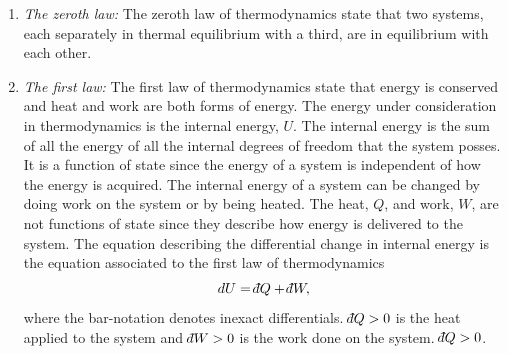 \begin{enumerate}
	\item \emph{The zeroth law:} The zeroth law of thermodynamics state that two systems, each separately in thermal equilibrium with a third, are in equilibrium with each other. 
	
	\item \emph{The first law:} The first law of thermodynamics state that energy is conserved and heat and work are both forms of energy. The energy under consideration in thermodynamics is the internal energy, $U$. The internal energy is the sum of all the energy of all the internal degrees of freedom that the system posses. It is a function of state since the energy of a system is independent of how the energy is acquired. The internal energy of a system can be changed by doing work on the system or by being heated. The heat, $Q$, and work, $W$, are not functions of state since they describe how energy is delivered to the system. The equation describing the differential change in internal energy is the equation associated to the first law of thermodynamics
	\begin{equation}
		dU=\dbar Q+\dbar W,
	\end{equation} 
	where the bar-notation denotes inexact differentials. $\dbar Q>0$ is the heat applied to the system and $\dbar W>0$ is the work done on the system. $\dbar Q>0$.
	

\end{enumerate}
